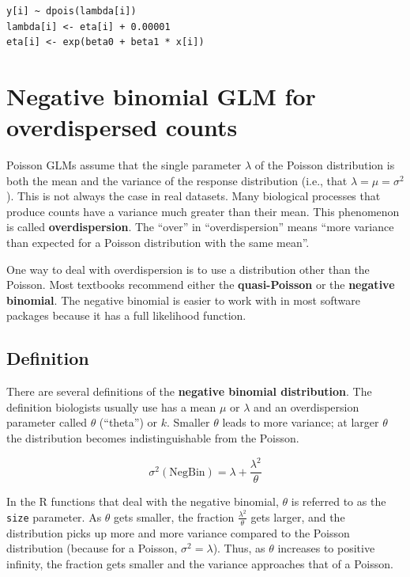 \documentclass[
  13,
  letterpaper,
]{report}
\begin{document}
\begin{verbatim}
y[i] ~ dpois(lambda[i])
lambda[i] <- eta[i] + 0.00001
eta[i] <- exp(beta0 + beta1 * x[i])
\end{verbatim}

\section{Negative binomial GLM for overdispersed
counts}\label{sec-glm1-nb}

Poisson GLMs assume that the single parameter \(\lambda\) of the Poisson
distribution is both the mean and the variance of the response
distribution (i.e., that \(\lambda=\mu=\sigma^2\)). This is not always
the case in real datasets. Many biological processes that produce counts
have a variance much greater than their mean. This phenomenon is called
\textbf{overdispersion}. The ``over'' in ``overdispersion'' means ``more
variance than expected for a Poisson distribution with the same mean''.

One way to deal with overdispersion is to use a distribution other than
the Poisson. Most textbooks recommend either the \textbf{quasi-Poisson}
or the \textbf{negative binomial}. The negative binomial is easier to
work with in most software packages because it has a full likelihood
function.

\subsection{Definition}\label{sec-glm1-nb-def}

There are several definitions of the \textbf{negative binomial
distribution}. The definition biologists usually use has a mean \(\mu\)
or \(\lambda\) and an overdispersion parameter called \(\theta\)
(``theta'') or \(k\). Smaller \(\theta\) leads to more variance; at
larger \(\theta\) the distribution becomes indistinguishable from the
Poisson.

\[\sigma^2\left(\text{NegBin}\right)=\lambda+\frac{\lambda^2}{\theta}\]

In the R functions that deal with the negative binomial, \(\theta\) is
referred to as the \texttt{size} parameter. As \(\theta\) gets smaller,
the fraction \(\frac{\lambda^2}{\theta}\) gets larger, and the
distribution picks up more and more variance compared to the Poisson
distribution (because for a Poisson, \(\sigma^2=\lambda\)). Thus, as
\(\theta\) increases to positive infinity, the fraction gets smaller and
the variance approaches that of a Poisson.
\end{document}
